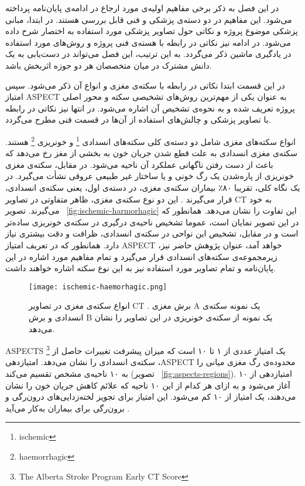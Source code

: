 

در این فصل به ذکر برخی مفاهیم اولیه‌ی مورد ارجاع در ادامه‌ی پایان‌نامه پرداخته می‌شود.
این مفاهیم در دو دسته‌ی پزشکی و فنی قابل بررسی هستند.
در ابتدا، مبانی پزشکی موضوع پروژه و نکاتی حول تصاویر پزشکی مورد استفاده به اختصار شرح داده می‌شود.
در ادامه نیز نکاتی در رابطه با هسته‌ی فنی پروژه و روش‌های مورد استفاده در یادگیری ماشین ذکر می‌گردد.
به این ترتیب، این فصل می‌تواند در دست‌یابی به یک دانش مشترک در میان متخصصان هر دو حوزه اثربخش باشد.


در این قسمت ابتدا نکاتی در رابطه با سکته‌ی مغزی و انواع آن ذکر می‌شود.
سپس امتیاز ASPECT به عنوان یکی از مهم‌ترین روش‌های تشخیصی سکته و محور اصلی پروژه تعریف شده و
به نحوه‌ی تشخیص آن اشاره می‌شود.
در انتها نیز نکاتی در رابطه با تصاویر پزشکی و چالش‌های استفاده از آن‌ها در قسمت فنی مطرح می‌گردد.


انواع سکته‌های مغزی شامل دو دسته‌ی کلی سکته‌های انسدادی
\footnote{ischemic}
و خونریزی
\footnote{haemorrhagic} 
هستند.
سکته‌ی مغزی انسدادی به علت قطع شدن جریان خون به بخشی از مغز رخ می‌دهد که باعث از دست رفتن ناگهانی عملکرد آن ناحیه می‌شود.
در مقابل، سکته‌ی مغزی خونریزی از پاره‌شدن یک رگ خونی و یا ساختار غیر طبیعی عروقی نشأت می‌گیرد.
در یک نگاه کلی، تقریبا ۸۰٪ بیماران سکته‌ی مغزی، در دسته‌ی اول، یعنی سکته‌ی انسدادی، قرار می‌گیرند \cite{donkor2018stroke}.
این دو نوع سکته‌ی مغزی، ظاهر متفاوتی در تصاویر CT به خود می‌گیرند.
تصویر ~\ref{fig:ischemic-harmorhagic} این تفاوت را نشان می‌دهد.
همانطور که در این تصویر نمایان است، عموما تشخیص ناحیه‌ی درگیری
در سکته‌ی خونریزی ساده‌تر است و در مقابل، تشخیص این نواحی در سکته‌ی انسدادی، ظرافت و دقت بیشتری نیاز دارد.
همانطور که در تعریف امتیاز ASPECT خواهد آمد، عنوان پژوهش حاضر نیز، زیرمجموعه‌ی 
سکته‌های انسدادی قرار می‌گیرد و تمام مفاهیم مورد اشاره در این پایان‌نامه و تمام تصاویر مورد استفاده نیز به این نوع سکته اشاره خواهند داشت.

\begin{figure}[ht]
\centering
\texttt{[image: ischemic-haemorhagic.png]}
\caption[]{انواع سکته‌ی مغزی در تصاویر CT \cite{le2018ischemic}. برش مغزی A یک نمونه سکته‌ی انسدادی و برش B یک نمونه از سکته‌ی خونریزی در این تصاویر را نشان می‌دهد.}
\label{fig:ischemic-haemorrhagic}
\end{figure}


ASPECTS 
\footnote{The Alberta Stroke Program Early CT Score}
یک امتیاز عددی از ۱ تا ۱۰ است که میزان پیشرفت تغییرات حاصل از سکته‌ی انسدادی را 
نشان می‌دهد.
 امتیاز‌دهی ،ASPECT 
 محدوده‌ی رگ مغزی میانی را به ۱۰ ناحیه‌ی مشخص تقسیم می‌کند (تصویر ~\ref{fig:aspects-regions}).
 امتیازدهی  از ۱۰ آغاز می‌شود و به ازای هر کدام از این ۱۰ ناحیه که علائم کاهش جریان 
 خون را نشان می‌دهند، یک امتیاز از ۱۰ کم می‌شود.
 این امتیاز برای تجویز لخته‌زدایی‌های درون‌رگی و برون‌رگی برای بیماران به‌کار می‌آید \cite{mokin2017aspects}.


